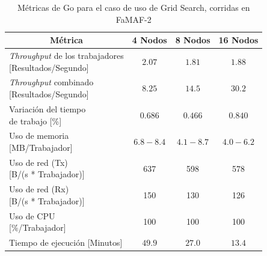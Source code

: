 \documentclass[11pt]{article}
\providecommand{\row}[1]{\parbox{150pt}{\setlength{\baselineskip}{0.2\baselineskip}\strut#1\strut}}
\newcommand{\gscap}[2]{\caption{Métricas de #1 para el caso de uso de Grid Search, corridas en #2}}
\newcommand{\english}[1]{\textit{#1}}
\begin{document}
\begin{table}[H]
\centering
\begin{tabular}{|l|c|c|c|}
\hline
\multicolumn{1}{|c|}{Métrica} & 4 Nodos & 8 Nodos & 16 Nodos \\ \hline
\row{\english{Throughput} de los trabajadores\\{[Resultados/Segundo]}} & $2.07$ & $1.81$ & $1.88$ \\ \hline
\row{\english{Throughput} combinado\\{[Resultados/Segundo]}} & $8.25$ & $14.5$ & $30.2$ \\ \hline
\row{Variación del tiempo\\de trabajo {[\%]}} & $0.686$ & $0.466$ & $0.840$ \\ \hline
\row{Uso de memoria\\{[MB/Trabajador]}} & $6.8-8.4$ & $4.1-8.7$ & $4.0-6.2$ \\ \hline
\row{Uso de red (Tx)\\{[B/(s * Trabajador)]}} & 637 & 598 & 578 \\ \hline
\row{Uso de red (Rx)\\{[B/(s * Trabajador)]}} & 150 & 130 & 126 \\ \hline
\row{Uso de CPU\\{[\%/Trabajador]}} & 100 & 100 & 100 \\ \hline
Tiempo de ejecución [Minutos] & $49.9$ & $27.0$ & $13.4$ \\ \hline
\end{tabular}
\gscap{Go}{FaMAF-2}
\end{table}
\end{document}
